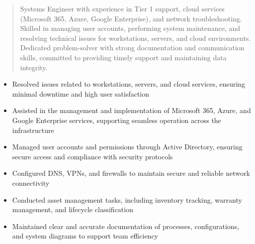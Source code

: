



\makecvheader

\begin{quote}
  \noindent
  Systems Engineer with experience in Tier 1 support, cloud services (Microsoft 365, Azure, Google Enterprise), and network troubleshooting. Skilled in managing user accounts, performing system maintenance, and resolving technical issues for workstations, servers, and cloud environments. Dedicated problem-solver with strong documentation and communication skills, committed to providing timely support and maintaining data integrity.
\end{quote}

\par\smallskip
\noindent
\begin{minipage}{20cm}
  \begin{minipage}{9.75cm}
    \begin{itemize}
      \item Resolved issues related to workstations, servers, and cloud services, ensuring minimal downtime and high user satisfaction
      \item Assisted in the management and implementation of Microsoft 365, Azure, and Google Enterprise services, supporting seamless operation across the infrastructure
      \item Managed user accounts and permissions through Active Directory, ensuring secure access and compliance with security protocols
    \end{itemize}
  \end{minipage}
  \hfill
  \begin{minipage}{9.75cm}
    \begin{itemize}
      \item Configured DNS, VPNs, and firewalls to maintain secure and reliable network connectivity
      \item Conducted asset management tasks, including inventory tracking, warranty management, and lifecycle classification
      \item Maintained clear and accurate documentation of processes, configurations, and system diagrams to support team efficiency
    \end{itemize}
  \end{minipage}
\end{minipage}
\par\smallskip
\divider

